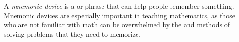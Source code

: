 \documentclass[12pt]{article}
\begin{document}
A {\sl mnemonic device\/} is a  or phrase that can help people remember something.  Mnemonic devices are especially important in teaching mathematics, as those who are not familiar with math can be overwhelmed by the  and methods of solving problems that they need to memorize.
\end{document}
